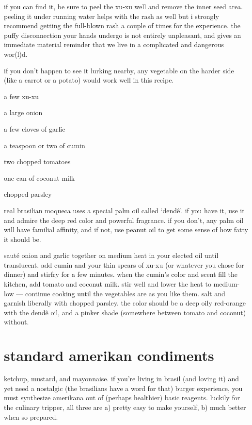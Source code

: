 if you can find it, be sure to peel the xu-xu well and remove the inner seed 
area. peeling it under running water helps with the rash as well but i 
strongly recommend getting the full-blown rash a couple of times for the 
experience. the puffy disconnection your hands undergo is not entirely 
unpleasant, and gives an immediate material reminder that we live in a 
complicated and dangerous wor(l)d.

if you don't happen to see it lurking nearby, any vegetable on the harder side 
(like a carrot or a potato) would work well in this recipe.

\begin{ingredients}
  \item a few xu-xu
  \item a large onion
  \item a few cloves of garlic
  \item a teaspoon or two of cumin
  \item two chopped tomatoes
  \item one can of coconut milk
  \item chopped parsley
\end{ingredients}

real brasilian moqueca uses a special palm oil called `dend\^{e}'. if you have 
it, use it and admire the deep red color and powerful fragrance. if you don't, 
any palm oil will have familial affinity, and if not, use peanut oil to get 
some sense of how fatty it should be.

saut\'{e} onion and garlic together on medium heat in your elected oil until 
translucent. add cumin and your thin spears of xu-xu (or whatever you chose 
for dinner) and stirfry for a few minutes. when the cumin's color and scent 
fill the kitchen, add tomato and coconut milk. stir well and lower the heat to 
medium-low --- continue cooking until the vegetables are as you like them. 
salt and garnish liberally with chopped parsley. the color should be a deep 
oily red-orange with the dend\^{e} oil, and a pinker shade (somewhere between 
tomato and coconut) without.

\section{standard amerikan condiments}

ketchup, mustard, and mayonnaise. if you're living in brasil (and loving it) 
and yet need a nostalgic (the brasilians have a word for that) burger 
experience, you must synthesize amerikana out of (perhaps healthier) basic 
reagents. luckily for the culinary tripper, all three are a) pretty easy to 
make yourself, b) much better when so prepared.

